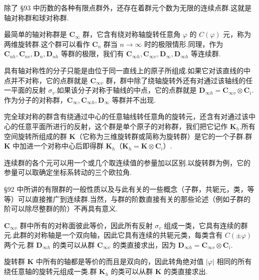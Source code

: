 除了 §93 中历数的各种有限点群外，还存在着群元个数为无限的连续点群.这就是轴对称群和球对称群.

最简单的轴对称群是 $\boldsymbol{C}_\infty$ 群，它含有绕对称轴旋转任意角 $\varphi$ 的 $C(\varphi)$ 元，称为两维旋转群.这个群可以看作 $\boldsymbol{C}_n$ 群当 $n\to\infty$ 时的极限情形.同理，作为 $\boldsymbol{C}_{nh},\boldsymbol{C}_{nv},\boldsymbol{D}_n,\boldsymbol{D}_{nh}$ 等群的极限，我们有 $\boldsymbol{C}_{\infty h},\boldsymbol{C}_{\infty v},\boldsymbol{D}_\infty,\boldsymbol{D}_{\infty h}$ 等连续群.

具有轴对称性的分子只能是由位于同一直线上的原子所组成.如果它对该直线的中点并不对称，它的点群就是 $\boldsymbol{C}_{\infty v}$ 群，群中除了绕轴旋转外还有对通过该轴线的任一平面的反射 $\sigma_v$.如果该分子对称于轴线的中点，它的点群就是 $\boldsymbol{D}_{\infty h}=\boldsymbol{C}_{\infty v}\otimes\boldsymbol{C}_i$.作为分子的对称群，$\boldsymbol{C}_\infty,\boldsymbol{C}_{\infty h},\boldsymbol{D}_\infty$ 等群并不出现.

完全球对称的群含有绕通过中心的任意轴线转任意角的旋转元，还含有对通过该中心的任意平面所进行的反射，这个群是单个原子的对称群，我们把它记作 $\boldsymbol{K}_h$.所有空间旋转所组成的群 $\boldsymbol{K}$（它称为三维旋转群或简称为旋转群）是它的一个子群.群 $\boldsymbol{K}$ 中加进一个对称中心后即得群 $\boldsymbol{K}_h$（$\boldsymbol{K}_h=\boldsymbol{K}\otimes\boldsymbol{C}_i$）.

连续群的各个元可以用一个或几个取连续值的参量加以区别.以旋转群为例，它的参量可以取确定坐标系转动的三个欧拉角.

§92 中所讲的有限群的一般性质以及与此有关的一些概念（子群，共轭元，类，等等）可以直接推广到连续群.当然，与群的阶数直接有关的那些论述（例如子群的阶可以除尽整群的阶）不再具有意义.

$\boldsymbol{C}_{\infty v}$ 群中所有的对称面彼此等价，因此所有反射 $\sigma_v$ 组成一类，它具有连续的群元.此群的对称轴是一个双向轴，因此它具有连续的共轭元类，每类含有 $C(\pm\varphi)$ 两个元.群 $\boldsymbol{D}_{\infty h}$ 的类可以从群 $\boldsymbol{C}_{\infty v}$ 的类直接求出，因为 $\boldsymbol{D}_{\infty h}=\boldsymbol{C}_{\infty v}\otimes\boldsymbol{C}_i$.

旋转群 $\boldsymbol{K}$ 中所有的轴都是等价的而且是双向的，因此转角绝对值 $|\varphi|$ 相同的所有绕任意轴的旋转元组成一类.群 $\boldsymbol{K}_h$ 的类可以从群 $\boldsymbol{K}$ 的类直接求出.

